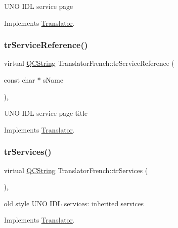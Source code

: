 U\+NO I\+DL service page 

Implements \mbox{\hyperlink{class_translator}{Translator}}.

\mbox{\label{class_translator_french_acbb64495833130e53bb3bc6bc3695f66}} 
\subsubsection{\texorpdfstring{trServiceReference()}{trServiceReference()}}
{\footnotesize\ttfamily virtual \mbox{\hyperlink{class_q_c_string}{Q\+C\+String}} Translator\+French\+::tr\+Service\+Reference (\begin{DoxyParamCaption}\item[{const char $\ast$}]{s\+Name }\end{DoxyParamCaption})\hspace{0.3cm}{\ttfamily [inline]}, {\ttfamily [virtual]}}

U\+NO I\+DL service page title 

Implements \mbox{\hyperlink{class_translator}{Translator}}.

\mbox{\label{class_translator_french_a35fefa9d487131185ef6046ac7a0b45d}} 
\subsubsection{\texorpdfstring{trServices()}{trServices()}}
{\footnotesize\ttfamily virtual \mbox{\hyperlink{class_q_c_string}{Q\+C\+String}} Translator\+French\+::tr\+Services (\begin{DoxyParamCaption}{ }\end{DoxyParamCaption})\hspace{0.3cm}{\ttfamily [inline]}, {\ttfamily [virtual]}}

old style U\+NO I\+DL services\+: inherited services 

Implements \mbox{\hyperlink{class_translator}{Translator}}.

\mbox{\label{class_translator_french_af5b3e1ad038d0a664861469be7854d99}} 
